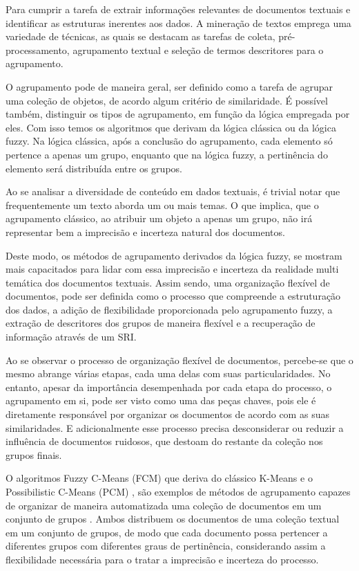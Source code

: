 Para cumprir a tarefa de extrair informações relevantes de documentos textuais e identificar as
estruturas inerentes aos dados. A mineração de textos emprega uma variedade de técnicas, as quais se
destacam as tarefas de coleta, pré-processamento, agrupamento textual e seleção de termos
descritores para o agrupamento. 

O agrupamento pode de maneira geral, ser definido como a tarefa de agrupar uma coleção de objetos,
de acordo algum critério de similaridade. É possível também, distinguir os tipos de agrupamento, em
função da lógica empregada por eles. Com isso temos os algoritmos que derivam da lógica clássica ou
da lógica fuzzy. Na lógica clássica, após a conclusão do agrupamento, cada elemento só pertence a
apenas um grupo, enquanto que na lógica fuzzy, a pertinência do elemento será distribuída entre os
grupos. 

Ao se analisar a diversidade de conteúdo em dados textuais, é trivial notar que frequentemente
um texto aborda um ou mais temas. O que implica, que o agrupamento clássico, ao atribuir um objeto a
apenas um grupo, não irá representar bem a imprecisão e incerteza natural dos documentos. 

Deste modo, os métodos de agrupamento derivados da lógica fuzzy, se mostram mais capacitados para
lidar com essa imprecisão e incerteza da realidade multi temática dos documentos textuais. Assim
sendo, uma organização flexível de documentos, pode ser definida como o processo que compreende a
estruturação dos dados, a adição de flexibilidade proporcionada pelo agrupamento fuzzy, a extração
de descritores dos grupos de maneira flexível e a recuperação de informação através de um SRI.

Ao se observar o processo de organização flexível de documentos, percebe-se que o mesmo abrange
várias etapas, cada uma delas com suas particularidades. No entanto, apesar da importância
desempenhada por cada etapa do processo, o agrupamento em si, pode ser visto como uma das peças
chaves, pois ele é diretamente responsável por organizar os documentos de acordo com as suas
similaridades. E adicionalmente esse processo precisa desconsiderar ou reduzir a influência de
documentos ruidosos, que destoam do restante da coleção nos grupos finais.

O algoritmos Fuzzy C-Means (FCM) \cite{Bezdek1984} que deriva do clássico K-Means
\cite{Macqueen1967} e o Possibilistic C-Means (PCM)
\cite{Krishnapuram1993}, são exemplos de métodos de agrupamento capazes de organizar de maneira
automatizada uma coleção de documentos em um conjunto de grupos
\cite{Mei2014,Tjhi2009,Prade2008,Saracoglu2008}. Ambos distribuem os documentos de uma coleção
textual em um conjunto de grupos, de modo que cada documento possa pertencer a diferentes grupos com
diferentes graus de pertinência, considerando assim a flexibilidade necessária para o tratar a
imprecisão e incerteza do processo.

